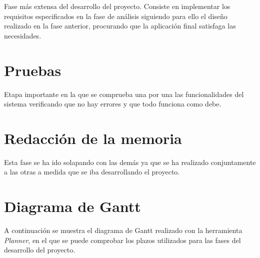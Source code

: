 Fase más extensa del desarrollo del proyecto. Consiste en implementar los requisitos especificados en la fase de análisis siguiendo para ello el diseño realizado en la fase anterior, procurando que la aplicación final satisfaga las necesidades.

\section{Pruebas}

Etapa importante en la que se comprueba una por una las funcionalidades del sistema verificando que no hay errores y que todo funciona como debe.

\section{Redacción de la memoria}
Esta fase se ha ido solapando con las demás ya que se ha realizado conjuntamente a las otras a medida que se iba desarrollando el proyecto. 

\section{Diagrama de Gantt}
A continuación se muestra el diagrama de Gantt realizado con la herramienta {\em Planner}, en el que se puede comprobar los plazos utilizados para las fases del desarrollo del proyecto.
\newpage




